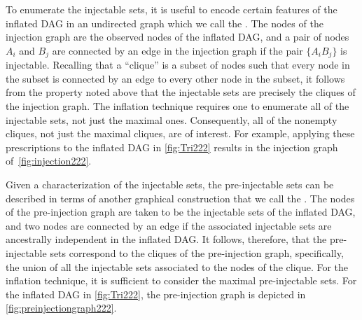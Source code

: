 To enumerate the injectable sets, it is useful to encode certain features of the inflated DAG in an undirected graph which we call the . The nodes of the injection graph are the observed nodes of the inflated DAG, and a pair of nodes $A_i$ and $B_j$ are connected by an edge in the injection graph if the pair $\{ A_i B_j\}$ is injectable.
Recalling that a ``clique'' is a subset of nodes such that every node in the subset is connected by an edge to every other node in the subset, it follows from the property noted above that the injectable sets are precisely the cliques of the injection graph.
 The inflation technique requires one to enumerate all of the injectable sets, not just the maximal ones.  Consequently, all of the nonempty cliques, not just the maximal cliques, are of interest.  For example, applying these prescriptions to the inflated DAG in \cref{fig:Tri222} results in the injection graph of~\cref{fig:injection222}.

Given a characterization of the injectable sets, the pre-injectable sets can be described in terms of another graphical construction that we call the .
The nodes of the pre-injection graph are taken to be the injectable sets of the inflated DAG, and two nodes are connected by an edge if the associated injectable sets are ancestrally independent in the inflated DAG. %
It follows, therefore, that the pre-injectable sets correspond to the cliques of the pre-injection graph, specifically, the union of all the injectable sets associated to the nodes of the clique. 
For the inflation technique, it is sufficient to consider the maximal pre-injectable sets.  
For the inflated DAG in \cref{fig:Tri222}, the pre-injection graph is depicted in \cref{fig:preinjectiongraph222}.  


